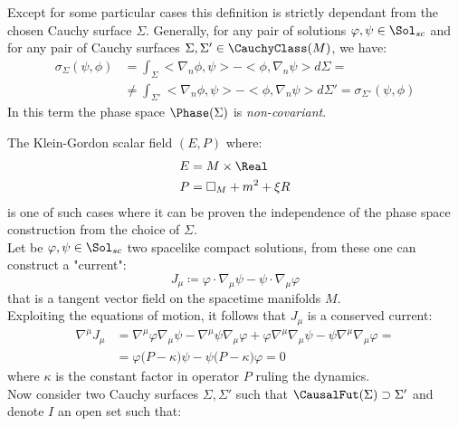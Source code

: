 \documentclass[Main]{subfiles}
\begin{document}
			\vspace{3mm}
			Except for some particular cases this definition is strictly dependant from the chosen Cauchy surface $\Sigma$.
			Generally, for any pair of solutions $\varphi, \psi \in \Sol_{sc}$ and for any pair of Cauchy surfaces 	$\Sigma, \Sigma' \in \CauchyClass(M)$, we have:
						\begin{align*}
							\sigma_\Sigma ( \psi, \phi) &= \int_\Sigma < \nabla_n \phi, \psi>  - <\phi, \nabla_n \psi > d\Sigma=\\
							&\neq \int_{\Sigma'} < \nabla_n \phi, \psi>  - <\phi, \nabla_n \psi > d\Sigma'= \sigma_{\Sigma'}(\psi,\phi)
						\end{align*}
		  In this term the phase space $\Phase(\Sigma)$ is \emph{non-covariant}.

		\begin{example}\label{Ex:IndipendentPhaseSpace}
			The Klein-Gordon scalar field $(E,P)$ where:
			\begin{align}
				E &= M \times \Real \nonumber\\
				P &= \square_M + m^2 + \xi R \label{Eq:KGOperator}
			\end{align}
			is one of such cases where it can be proven the independence of the phase space construction from the choice of $\Sigma$.
			\\
			Let be $\varphi, \psi \in \Sol_{sc}$ two spacelike compact solutions, from these one can construct a "current":
			\begin{displaymath}
					J_\mu \coloneqq \varphi \cdot \nabla_\mu \psi  - \psi \cdot \nabla_\mu \varphi
			\end{displaymath}
			that is a tangent vector field on the spacetime manifolds $M$.
			\\
			Exploiting the equations of motion, it follows that $J_\mu$ is a conserved current:
			\begin{eqnarray}\label{Eq:ScalarCurrent}
				\nabla^\mu J_\mu &= \nabla^\mu\varphi \nabla_\mu\psi  - \nabla^\mu \psi \nabla_\mu \varphi +
				\varphi \nabla^\mu \nabla_\mu \psi - \psi \nabla^\mu \nabla_\mu \varphi	= \nonumber \\
				&=  \varphi \big( P - \kappa \big) \psi - \psi \big( P - \kappa \big) \varphi = 0
			\end{eqnarray}
			where $\kappa$ is the constant factor in operator $P$ ruling the dynamics.
			\\
			Now consider two Cauchy surfaces $\Sigma, \Sigma'$ such that $\CausalFut(\Sigma) \supset \Sigma'$ and denote $I$ an open set such that:

\end{example}
\end{document}
